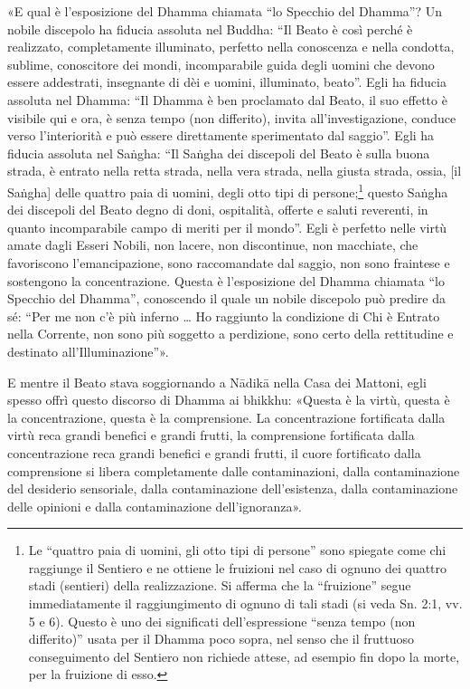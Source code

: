 «E qual è l’esposizione del Dhamma chiamata “lo Specchio del Dhamma”? Un
nobile discepolo ha fiducia assoluta nel Buddha: “Il Beato è così perché
è realizzato, completamente illuminato, perfetto nella conoscenza e
nella condotta, sublime, conoscitore dei mondi, incomparabile guida
degli uomini che devono essere addestrati, insegnante di dèi e uomini,
illuminato, beato”. Egli ha fiducia assoluta nel Dhamma: “Il Dhamma è
ben proclamato dal Beato, il suo effetto è visibile qui e ora, è senza
tempo (non differito), invita all’investigazione, conduce verso
l’interiorità e può essere direttamente sperimentato dal saggio”. Egli
ha fiducia assoluta nel Saṅgha: “Il Saṅgha dei discepoli del Beato è
sulla buona strada, è entrato nella retta strada, nella vera strada,
nella giusta strada, ossia, [il Saṅgha] delle quattro paia di uomini,
degli otto tipi di persone;\footnote{Le “quattro paia di uomini, gli otto tipi di persone” sono spiegate come chi raggiunge il Sentiero e ne ottiene le fruizioni nel caso di ognuno dei quattro stadi (sentieri) della realizzazione. Si afferma che la “fruizione” segue immediatamente il raggiungimento di ognuno di tali stadi (si veda Sn. 2:1, vv. 5 e 6). Questo è uno dei significati dell’espressione “senza tempo (non differito)” usata per il Dhamma poco sopra, nel senso che il fruttuoso conseguimento del Sentiero non richiede attese, ad esempio fin dopo la morte, per la fruizione di esso.} questo Saṅgha dei discepoli
del Beato degno di doni, ospitalità, offerte e saluti reverenti, in
quanto incomparabile campo di meriti per il mondo”. Egli è perfetto
nelle virtù amate dagli Esseri Nobili, non lacere, non discontinue, non
macchiate, che favoriscono l’emancipazione, sono raccomandate dal
saggio, non sono fraintese e sostengono la concentrazione. Questa è
l’esposizione del Dhamma chiamata “lo Specchio del Dhamma”, conoscendo
il quale un nobile discepolo può predire da sé: “Per me non c’è più
inferno … Ho raggiunto la condizione di Chi è Entrato nella Corrente,
non sono più soggetto a perdizione, sono certo della rettitudine e
destinato all’Illuminazione”».


E mentre il Beato stava soggiornando a Nādikā nella Casa dei Mattoni,
egli spesso offrì questo discorso di Dhamma ai bhikkhu: «Questa è la
virtù, questa è la concentrazione, questa è la comprensione. La
concentrazione fortificata dalla virtù reca grandi benefici e grandi
frutti, la comprensione fortificata dalla concentrazione reca grandi
benefici e grandi frutti, il cuore fortificato dalla comprensione si
libera completamente dalle contaminazioni, dalla contaminazione del
desiderio sensoriale, dalla contaminazione dell’esistenza, dalla
contaminazione delle opinioni e dalla contaminazione dell’ignoranza».


